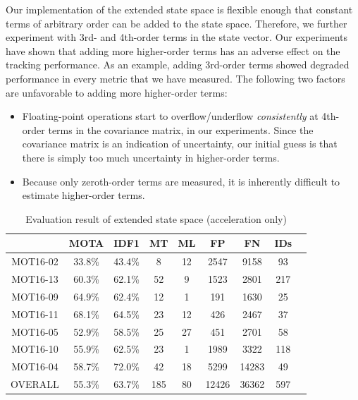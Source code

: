 \documentclass[conference]{IEEEtran}
\begin{document}
Our implementation of the extended state space is flexible enough that constant terms of arbitrary order can be added to the state space. Therefore, we further experiment with 3rd- and 4th-order terms in the state vector. Our experiments have shown that adding more higher-order terms has an adverse effect on the tracking performance. As an example, adding 3rd-order terms showed degraded performance in every metric that we have measured. The following two factors are unfavorable to adding more higher-order terms:

\begin{itemize}
    \item Floating-point operations start to overflow/underflow \emph{consistently} at 4th-order terms in the covariance matrix, in our experiments. Since the covariance matrix is an indication of uncertainty, our initial guess is that there is simply too much uncertainty in higher-order terms.
    \item Because only zeroth-order terms are measured, it is inherently difficult to estimate higher-order terms.
\end{itemize}

\linespread{1.2}
\begin{table}
    \caption{Evaluation result of extended state space (acceleration only)}
    \label{tab:extended-state-space}
    \begin{tabular}{ccccccccc}
        \hline
         & MOTA & IDF1 & MT & ML & FP & FN & IDs\\
        \hline
        MOT16-02 & 33.8\% & 43.4\% & 8 & 12 & 2547 & 9158 & 93\\
        MOT16-13 & 60.3\% & 62.1\% & 52 & 9 & 1523 & 2801 & 217\\
        MOT16-09 & 64.9\% & 62.4\% & 12 & 1 & 191 & 1630 & 25\\
        MOT16-11 & 68.1\% & 64.5\% & 23 & 12 & 426 & 2467 & 37\\
        MOT16-05 & 52.9\% & 58.5\% & 25 & 27 & 451 & 2701 & 58\\
        MOT16-10 & 55.9\% & 62.5\% & 23 & 1 & 1989 & 3322 & 118\\
        MOT16-04 & 58.7\% & 72.0\% & 42 & 18 & 5299 & 14283 & 49\\
        OVERALL & 55.3\% & 63.7\% & 185 & 80 & 12426 & 36362 & 597\\
        \hline
    \end{tabular}
\end{table}
\linespread{1}
\end{document}
